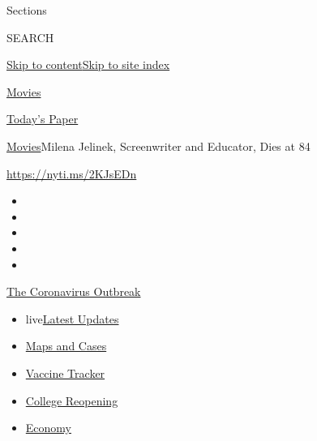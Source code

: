 Sections

SEARCH

\protect\hyperlink{site-content}{Skip to
content}\protect\hyperlink{site-index}{Skip to site index}

\href{https://www.nytimes.com/section/movies}{Movies}

\href{https://myaccount.nytimes.com/auth/login?response_type=cookie\&client_id=vi}{}

\href{https://www.nytimes.com/section/todayspaper}{Today's Paper}

\href{/section/movies}{Movies}\textbar{}Milena Jelinek, Screenwriter and
Educator, Dies at 84

\url{https://nyti.ms/2KJsEDn}

\begin{itemize}
\item
\item
\item
\item
\item
\end{itemize}

\href{https://www.nytimes.com/news-event/coronavirus?action=click\&pgtype=Article\&state=default\&region=TOP_BANNER\&context=storylines_menu}{The
Coronavirus Outbreak}

\begin{itemize}
\tightlist
\item
  live\href{https://www.nytimes.com/2020/08/03/world/coronavirus-covid-19.html?action=click\&pgtype=Article\&state=default\&region=TOP_BANNER\&context=storylines_menu}{Latest
  Updates}
\item
  \href{https://www.nytimes.com/interactive/2020/us/coronavirus-us-cases.html?action=click\&pgtype=Article\&state=default\&region=TOP_BANNER\&context=storylines_menu}{Maps
  and Cases}
\item
  \href{https://www.nytimes.com/interactive/2020/science/coronavirus-vaccine-tracker.html?action=click\&pgtype=Article\&state=default\&region=TOP_BANNER\&context=storylines_menu}{Vaccine
  Tracker}
\item
  \href{https://www.nytimes.com/2020/08/02/us/covid-college-reopening.html?action=click\&pgtype=Article\&state=default\&region=TOP_BANNER\&context=storylines_menu}{College
  Reopening}
\item
  \href{https://www.nytimes.com/live/2020/08/03/business/stock-market-today-coronavirus?action=click\&pgtype=Article\&state=default\&region=TOP_BANNER\&context=storylines_menu}{Economy}
\end{itemize}

